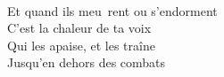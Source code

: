 \\
Et quand ils \colorbox{blue!15}{meu}~rent ou s'endorment\\
C'est la chaleur de ta voix\\
Qui les apaise, et les traîne\\
Jusqu'en dehors des combats\\
